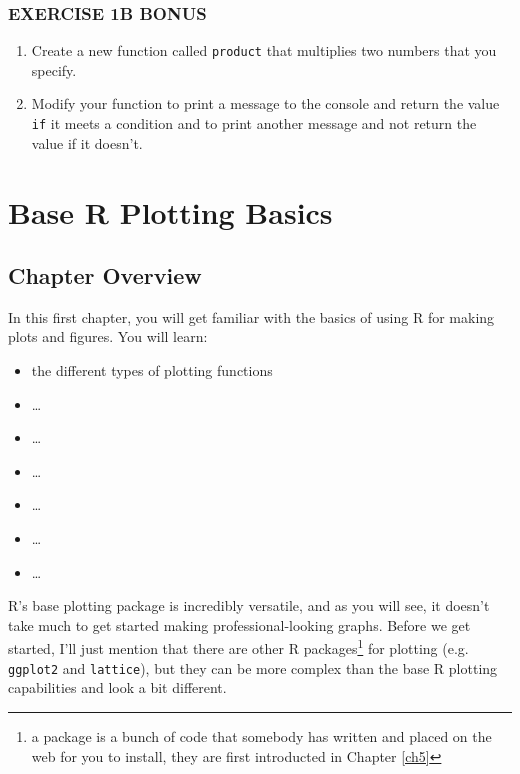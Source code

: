 \documentclass[]{book}
\providecommand{\tightlist}{%
  \setlength{\itemsep}{0pt}\setlength{\parskip}{0pt}}
\let\rmarkdownfootnote\footnote%
\def\footnote{\protect\rmarkdownfootnote}
\theoremstyle{definition}
\theoremstyle{definition}
\theoremstyle{definition}
\theoremstyle{remark}
\begin{document}
\subsection*{EXERCISE 1B BONUS}\label{exercise-1b-bonus}

\begin{enumerate}
\def\labelenumi{\arabic{enumi}.}
\item
  Create a new function called \texttt{product} that multiplies two
  numbers that you specify.
\item
  Modify your function to print a message to the console and return the
  value \texttt{if} it meets a condition and to print another message
  and not return the value if it doesn't.
\end{enumerate}

\chapter{Base R Plotting Basics}\label{ch2}

\section*{Chapter Overview}\label{chapter-overview-1}

In this first chapter, you will get familiar with the basics of using R
for making plots and figures. You will learn:

\begin{itemize}
\tightlist
\item
  the different types of plotting functions
\item
  \ldots{}
\item
  \ldots{}
\item
  \ldots{}
\item
  \ldots{}
\item
  \ldots{}
\item
  \ldots{}
\end{itemize}

R's base plotting package is incredibly versatile, and as you will see,
it doesn't take much to get started making professional-looking graphs.
Before we get started, I'll just mention that there are other R
packages\footnote{a package is a bunch of code that somebody has written
  and placed on the web for you to install, they are first introducted
  in Chapter \ref{ch5}} for plotting (e.g. \texttt{ggplot2} and
\texttt{lattice}), but they can be more complex than the base R plotting
capabilities and look a bit different.
\end{document}
